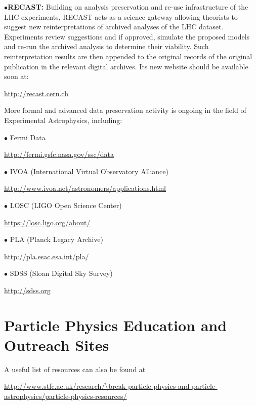 \medskip

\item{$\bullet$}{\bf RECAST:} 
Building on analysis preservation and re-use infrastructure of the LHC experiments, RECAST acts as a science gateway allowing theorists to suggest new reinterpretations of archived analyses of the LHC dataset. Experiments review suggestions and if approved, simulate the proposed models and re-run the archived analysis to determine their viability. Such reinterpretation results are then appended to the original records of the original publication in the relevant digital archives.
Its new website should be available soon at:
	\item{}\qquad\url{http://recast.cern.ch}


\medskip


\medskip

More formal and advanced data preservation activity is ongoing in the field of Experimental Astrophysics, including:
\item{$\bullet$}
Fermi Data\item{}\qquad\url{http://fermi.gsfc.nasa.gov/ssc/data} 
\item{$\bullet$}
IVOA (International Virtual Observatory Alliance) \item{}\qquad\url{http://www.ivoa.net/astronomers/applications.html}
\item{$\bullet$}
LOSC (LIGO Open Science Center) \item{}\qquad\url{https://losc.ligo.org/about/}
\item{$\bullet$}
PLA (Planck Legacy Archive)  \item{}\qquad\url{http://pla.esac.esa.int/pla/}
\item{$\bullet$}
SDSS (Sloan Digital Sky Survey) \item{}\qquad\url{http://sdss.org}
\medskip


\section{Particle Physics Education and Outreach Sites}  %

\medskip

A useful list of resources can also be found at
	\item{}\qquad\url{http://www.stfc.ac.uk/research/\break particle-physics-and-particle-astrophysics/particle-physics-resources/}

\medskip
\medskip

